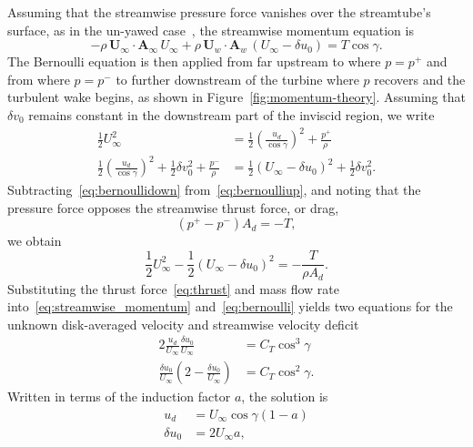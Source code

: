 Assuming that the streamwise pressure force vanishes over the streamtube's surface, as in the un-yawed case~\cite{Glauert1935a}, the streamwise momentum equation  is
\begin{equation}
\label{eq:streamwise_momentum}
- \rho \, \mathbf{U}_\infty \cdot \mathbf{A}_\infty \,U_\infty + \rho\, \mathbf{U}_w \cdot \mathbf{A}_w\, (U_\infty - \delta u_0) = T \cos \gamma.
\end{equation}
The Bernoulli equation is then applied from far upstream to where $p=p^+$ and from where $p=p^-$ to further downstream of the turbine where $p$ recovers and the turbulent wake begins, as shown in Figure~\ref{fig:momentum-theory}. Assuming that $\delta v_0$ remains constant in the downstream part of the inviscid region, we write
\begin{align}
\label{eq:bernoulliup}
\frac{1}{2}  U_\infty^2   &= \frac{1}{2}   \left(\frac{u_d}{\cos \gamma}\right)^2 + \frac{p^+}{\rho~} \\
\label{eq:bernoullidown}
\frac{1}{2} \left(\frac{u_d}{\cos \gamma}\right)^2 + \frac{1}{2}  \delta v_0^2 +\frac{p^- }{\rho~}   &= \frac{1}{2}  (U_\infty - \delta u_0)^2 + \frac{1}{2}   \delta v_0^2.
\end{align}
%
Subtracting~\eqref{eq:bernoullidown} from~\eqref{eq:bernoulliup}, and noting that the pressure force opposes the streamwise thrust force, or drag, 
\begin{equation}
\left(p^+ - p^-\right) A_d   = -T,
\end{equation}
we obtain
%
\begin{equation}
\label{eq:bernoulli}
\frac{1}{2}  U_\infty^2 - \frac{1}{2}  (U_\infty - \delta u_0)^2  = -\frac{T}{\rho A_d}.
\end{equation}
%
Substituting the thrust force~\eqref{eq:thrust} and mass flow rate into~\eqref{eq:streamwise_momentum} and~\eqref{eq:bernoulli} yields two equations for the unknown disk-averaged velocity and streamwise velocity deficit
%
\begin{align}
2 \frac{u_d}{U_\infty} \frac{\delta u_0}{U_\infty} &= C_T \cos^3 \gamma \\
\frac{\delta u_0}{U_\infty} \left( 2 - \frac{\delta u_0}{U_\infty} \right) &= C_T \cos^2 \gamma.
\end{align}
%
Written in terms of the induction factor $a$, the solution is
\begin{align}
\label{eq:sys2}
u_d &= U_\infty \cos \gamma (1-a) \\
\delta u_0  &= 2 U_\infty a,
\end{align}
